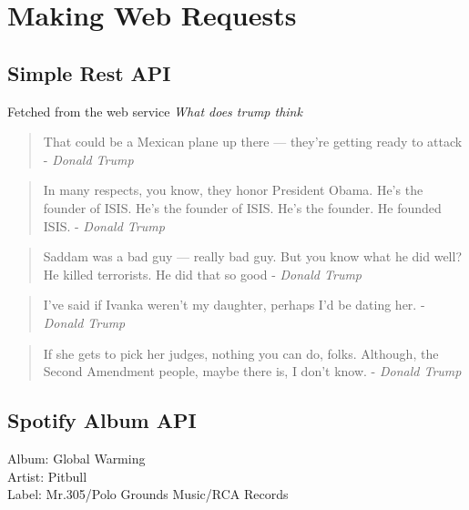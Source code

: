 \documentclass{article}
\begin{document}
  

  \section{Making Web Requests}
  \label{sec:Making Web Requests}

    \subsection{Simple Rest API}
    \label{sub:Simple Rest API}
      Fetched from the web service \textit{What does trump think}\\
                    \begin{quote}
          That could be a Mexican plane up there — they're getting ready to attack - \textit{Donald Trump}
        \end{quote}
                    \begin{quote}
          In many respects, you know, they honor President Obama. He's the founder of ISIS. He's the founder of ISIS. He's the founder. He founded ISIS. - \textit{Donald Trump}
        \end{quote}
                    \begin{quote}
          Saddam was a bad guy — really bad guy. But you know what he did well? He killed terrorists. He did that so good - \textit{Donald Trump}
        \end{quote}
                    \begin{quote}
          I've said if Ivanka weren't my daughter, perhaps I'd be dating her. - \textit{Donald Trump}
        \end{quote}
                    \begin{quote}
          If she gets to pick her judges, nothing you can do, folks. Although, the Second Amendment people, maybe there is, I don't know. - \textit{Donald Trump}
        \end{quote}
      

    \subsection{Spotify Album API}
    \label{sub:Spotify Album API}
        Album: Global Warming \\
    Artist: Pitbull \\
    Label: Mr.305/Polo Grounds Music/RCA Records \\
\end{document}

